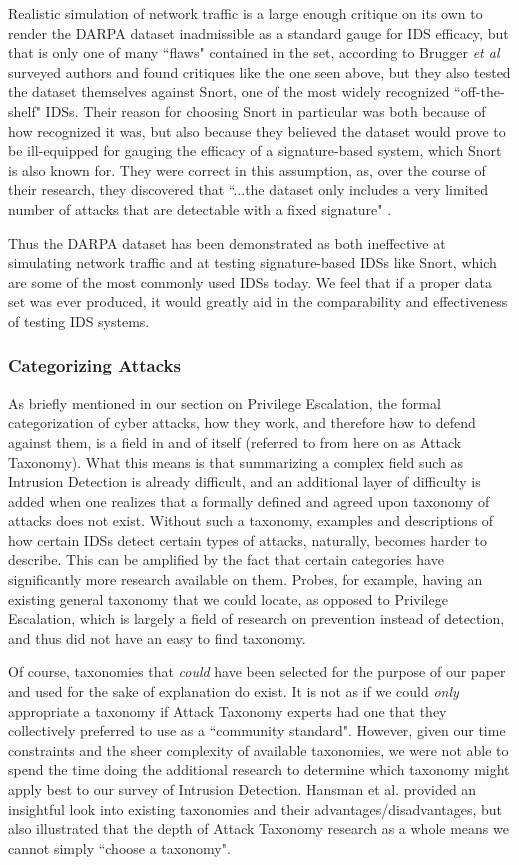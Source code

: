 \documentclass{acm_proc_article-sp}
\begin{document}
    	Realistic simulation of network traffic is a large enough critique on its own to render the DARPA dataset inadmissible as a standard gauge for IDS efficacy, but that is only one of many ``flaws" contained in the set, according to Brugger \emph{et al} \cite{Brugger2007} surveyed authors and found critiques like the one seen above, but they also tested the dataset themselves against Snort, one of the most widely recognized ``off-the-shelf" IDSs. Their reason for choosing Snort in particular was both because of how recognized it was, but also because they believed the dataset would prove to be ill-equipped for gauging the efficacy of a signature-based system, which Snort is also known for. They were correct in this assumption, as, over the course of their research, they discovered that ``...the dataset only includes a very limited number of attacks that are detectable with a fixed signature" \cite{Brugger2007}. 
    	
    	Thus the DARPA dataset has been demonstrated as both ineffective at simulating network traffic and at testing signature-based IDSs like Snort, which are some of the most commonly used IDSs today. We feel that if a proper data set was ever produced, it would greatly aid in the comparability and effectiveness of testing IDS systems.
    	\subsubsection{Categorizing Attacks} 
    	As briefly mentioned in our section on Privilege Escalation, the formal categorization of cyber attacks, how they work, and therefore how to defend against them, is a field in and of itself (referred to from here on as Attack Taxonomy). What this means is that summarizing a complex field such as Intrusion Detection is already difficult, and an additional layer of difficulty is added when one realizes that a formally defined and agreed upon taxonomy of attacks does not exist. Without such a taxonomy, examples and descriptions of how certain IDSs detect certain types of attacks, naturally, becomes harder to describe. This can be amplified by the fact that certain categories have significantly more research available on them. Probes, for example, having an existing general taxonomy that we could locate, as opposed to Privilege Escalation, which is largely a field of research on prevention instead of detection, and thus did not have an easy to find taxonomy. 
    	
    	Of course, taxonomies that \emph{could} have been selected for the purpose of our paper and used for the sake of explanation do exist. It is not as if we could \emph{only} appropriate a taxonomy if Attack Taxonomy experts had one that they collectively preferred to use as a ``community standard". However, given our time constraints and the sheer complexity of available taxonomies, we were not able to spend the time doing the additional research to determine which taxonomy might apply best to our survey of Intrusion Detection. Hansman et al. \cite{Hansman2005} provided an insightful look into existing taxonomies and their advantages/disadvantages, but also illustrated that the depth of Attack Taxonomy research as a whole means we cannot simply ``choose a taxonomy". 
    	
\end{document}
